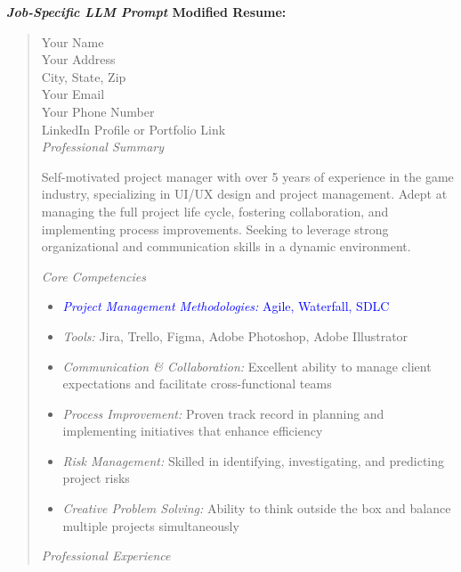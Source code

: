         \textbf{\textit{Job-Specific LLM Prompt} Modified Resume:}
        \begin{quote}
            Your Name \\
            Your Address \\
            City, State, Zip \\
            Your Email \\
            Your Phone Number \\
            LinkedIn Profile or Portfolio Link \\
        
            \textit{Professional Summary}
            
            Self-motivated project manager with over 5 years of experience in the game industry, specializing in UI/UX design and project management. Adept at managing the full project life cycle, fostering collaboration, and implementing process improvements. Seeking to leverage strong organizational and communication skills in a dynamic environment.
        
            \textit{Core Competencies}
            
            \begin{itemize}
                \item \textcolor{blue}{\textit{Project Management Methodologies:} Agile, Waterfall, SDLC}
                \item \textit{Tools:} Jira, Trello, Figma, Adobe Photoshop, Adobe Illustrator
                \item \textit{Communication \& Collaboration:} Excellent ability to manage client expectations and facilitate cross-functional teams
                \item \textit{Process Improvement:} Proven track record in planning and implementing initiatives that enhance efficiency
                \item \textit{Risk Management:} Skilled in identifying, investigating, and predicting project risks
                \item \textit{Creative Problem Solving:} Ability to think outside the box and balance multiple projects simultaneously
            \end{itemize}
        
            \textit{Professional Experience}
            

\end{quote}
